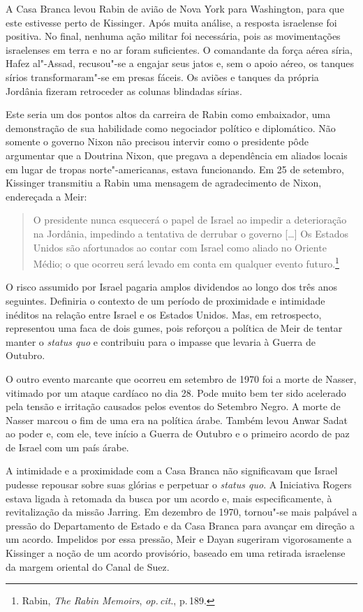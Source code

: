 A Casa Branca levou Rabin de avião de Nova York para Washington, para
que este estivesse perto de Kissinger. Após muita análise, a resposta
israelense foi positiva. No final, nenhuma ação militar foi necessária,
pois as movimentações israelenses em terra e no ar foram suficientes. O
comandante da força aérea síria, Hafez al"-Assad, recusou"-se a engajar
seus jatos e, sem o apoio aéreo, os tanques sírios transformaram"-se em
presas fáceis. Os aviões e tanques da própria Jordânia fizeram
retroceder as colunas blindadas sírias.

Este seria um dos pontos altos da carreira de Rabin como embaixador, uma
demonstração de sua habilidade como negociador político e diplomático.
Não somente o governo Nixon não precisou intervir como o presidente pôde
argumentar que a Doutrina Nixon, que pregava a dependência em aliados
locais em lugar de tropas norte"-americanas, estava funcionando. Em 25 de
setembro, Kissinger transmitiu a Rabin uma mensagem de agradecimento de
Nixon, endereçada a Meir:

\begin{quote}
O presidente nunca esquecerá o papel de Israel ao impedir a
deterioração na Jordânia, impedindo a tentativa de derrubar o governo {[}\ldots{}{]}
Os Estados Unidos são afortunados ao contar com Israel como aliado no
Oriente Médio; o que ocorreu será levado em conta em qualquer evento
futuro.\footnote{Rabin, \emph{The Rabin Memoirs}, \emph{op.\,cit}., p.\,189.}
\end{quote}

O risco assumido por Israel pagaria amplos dividendos ao longo dos três
anos seguintes. Definiria o contexto de um período de proximidade e
intimidade inéditos na relação entre Israel e os Estados Unidos. Mas, em
retrospecto, representou uma faca de dois gumes, pois reforçou a
política de Meir de tentar manter o \emph{status quo} e contribuiu para
o impasse que levaria à Guerra de Outubro.

O outro evento marcante que ocorreu em setembro de 1970 foi a morte de
Nasser, vitimado por um ataque cardíaco no dia 28. Pode muito bem ter
sido acelerado pela tensão e irritação causados pelos eventos do
Setembro Negro. A morte de Nasser marcou o fim de uma era na política
árabe. Também levou Anwar Sadat ao poder e, com ele, teve início a Guerra de Outubro e
o primeiro acordo de paz de Israel com um país árabe.

A intimidade e a proximidade com a Casa Branca não significavam que
Israel pudesse repousar sobre suas glórias e perpetuar o \emph{status
quo}. A Iniciativa Rogers estava ligada à retomada da busca por um
acordo e, mais especificamente, à revitalização da missão Jarring. Em
dezembro de 1970, tornou"-se mais palpável a pressão do Departamento de
Estado e da Casa Branca para avançar em direção a um acordo. Impelidos
por essa pressão, Meir e Dayan sugeriram vigorosamente a Kissinger a
noção de um acordo provisório, baseado em uma retirada israelense da
margem oriental do Canal de Suez.

